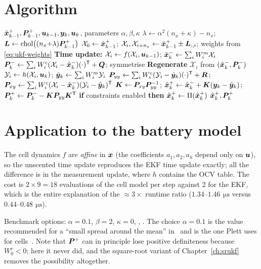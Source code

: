 \section{Algorithm}
\begin{algorithm}[H]
\caption{UKF --- one sampling period (additive noise)}
\begin{algorithmic}[1]
\Require $\hat{\bm{x}}^{+}_{k-1}, \bm{P}^{+}_{k-1}, \bm{u}_{k-1}, \bm{y}_k, \bm{u}_k$, parameters $\alpha,\beta,\kappa$
\State $\lambda \gets \alpha^2(n_x+\kappa)-n_x$; \; $\bm{L} \gets \operatorname{chol}\!\big((n_x{+}\lambda)\bm{P}^{+}_{k-1}\big)$
\State $\mathcal{X}_0\gets\hat{\bm{x}}^{+}_{k-1}$; \; $\mathcal{X}_{i},\mathcal{X}_{i+n_x} \gets \hat{\bm{x}}^{+}_{k-1} \pm \bm{L}_{:,i}$; weights from \eqref{eq:ukf-weights}
\State \textbf{Time update:} $\mathcal{X}_i \gets f(\mathcal{X}_i,\bm{u}_{k-1})$;\;
       $\hat{\bm{x}}^{-}_k \gets \sum_i W^m_i\mathcal{X}_i$
\State $\bm{P}^{-}_k \gets \sum_i W^c_i(\mathcal{X}_i-\hat{\bm{x}}^{-}_k)(\cdot)^{\mathsf{T}} + \bm{Q}$; symmetrise
\State \textbf{Regenerate} $\mathcal{X}_i$ from $(\hat{\bm{x}}^{-}_k,\bm{P}^{-}_k)$
\State $\mathcal{Y}_i \gets h(\mathcal{X}_i,\bm{u}_k)$; \; $\hat{\bm{y}}_k \gets \sum_i W^m_i \mathcal{Y}_i$
\State $\bm{P}_{yy} \gets \sum_i W^c_i (\mathcal{Y}_i-\hat{\bm{y}}_k)(\cdot)^{\mathsf{T}} + \bm{R}$; \;
       $\bm{P}_{xy} \gets \sum_i W^c_i (\mathcal{X}_i-\hat{\bm{x}}^{-}_k)(\mathcal{Y}_i-\hat{\bm{y}}_k)^{\mathsf{T}}$
\State $\bm{K}\gets\bm{P}_{xy}\bm{P}_{yy}^{-1}$; \;
       $\hat{\bm{x}}^{+}_k \gets \hat{\bm{x}}^{-}_k + \bm{K}(\bm{y}_k-\hat{\bm{y}}_k)$; \;
       $\bm{P}^{+}_k \gets \bm{P}^{-}_k - \bm{K}\bm{P}_{yy}\bm{K}^{\mathsf{T}}$
\State \textbf{if} constraints enabled \textbf{then} $\hat{\bm{x}}^{+}_k \gets \Pi(\hat{\bm{x}}^{+}_k)$
\Ensure $\hat{\bm{x}}^{+}_k, \bm{P}^{+}_k$
\end{algorithmic}
\end{algorithm}

\section{Application to the battery model}
The cell dynamics $f$ are \emph{affine} in $\bm{x}$ (the coefficients $a_1,a_2,a_h$ depend only
on $\bm{u}$), so the unscented time update reproduces the EKF time update exactly; all the
difference is in the measurement update, where $h$ contains the OCV table. The cost is
$2\times 9 = 18$ evaluations of the cell model per step against 2 for the EKF, which is the
entire explanation of the $\approx 3\times$ runtime ratio
($1.34$--$1.46\,\SI{}{\micro\second}$ versus $0.44$--$0.48\,\SI{}{\micro\second}$).

Benchmark options: $\alpha = 0.1$, $\beta = 2$, $\kappa = 0$,
, . The choice $\alpha=0.1$ is
the value recommended for a ``small spread around the mean'' in~\cite{wan2000ukf} and is the
one Plett uses for cells~\cite{plett2006spkf1}. Note that $\bm{P}^{+}$ can in principle lose
positive definiteness because $W_0^c<0$; here it never did, and the square-root variant of
Chapter~\ref{ch:srukf} removes the possibility altogether.

